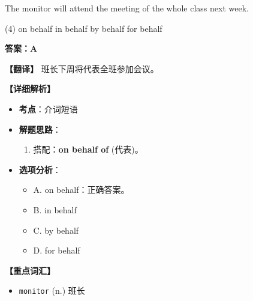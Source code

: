 \documentclass[11pt, a4paper]{article}
\newcommand{\analysis}[4]{
    \begin{solutionbox}
        \textbf{答案：#1}
        
        \textbf{【翻译】} #2
        
        \textbf{【详细解析】}
        #3
        
        \textbf{【重点词汇】}
        #4
    \end{solutionbox}
}
\newcommand{\blank}{\underline{\hspace{1.5cm}}}
\begin{document}
\begin{questions}
    \item The monitor will attend the meeting \blank of the whole class next week.
    \begin{tasks}(4)
        \task on behalf \task in behalf \task by behalf \task for behalf
    \end{tasks}
    \analysis{A}{班长下周将代表全班参加会议。}{
        \begin{itemize}
            \item \textbf{考点}：介词短语
            \item \textbf{解题思路}：
                \begin{enumerate}
                    \item 搭配：\textbf{on behalf of} (代表)。
                \end{enumerate}
            \item \textbf{选项分析}：
                \begin{itemize}
                    \item A. on behalf：正确答案。
                    \item B. in behalf
                    \item C. by behalf
                    \item D. for behalf
                \end{itemize}
        \end{itemize}
    }{
        \begin{itemize}
            \item \texttt{monitor} (n.) 班长
        \end{itemize}
    }
\end{questions}
\end{document}
